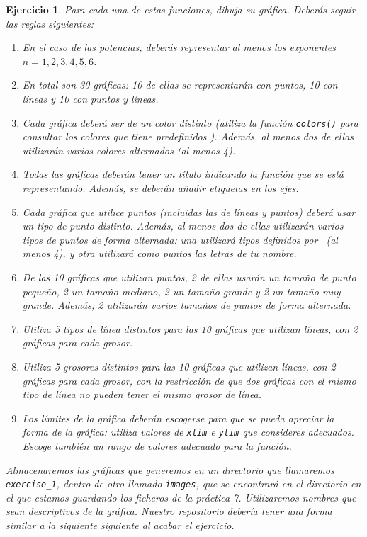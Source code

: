 \documentclass[11pt,a4paper]{article}
\newcommand{\R}{\textcolor{azuluc}{\faIcon{r-project}}}
\theoremstyle{exercise}
\newtheorem{exercise}{Ejercicio}
\begin{document}
\begin{exercise}
Para cada una de estas funciones, dibuja su gráfica. Deberás seguir las reglas siguientes:
\begin{enumerate}
	\item En el caso de las potencias, deberás representar al menos los exponentes $n=1,2,3,4,5,6$.

	\item En total son 30 gráficas: 10 de ellas se representarán con puntos, 10 con líneas y 10 con puntos y líneas.
	
	\item Cada gráfica deberá ser de un color distinto (utiliza la función \texttt{colors()} para consultar los colores que tiene predefinidos \R). Además, al menos dos de ellas utilizarán varios colores alternados (al menos 4).
		
	\item Todas las gráficas deberán tener un título indicando la función que se está representando. Además, se deberán añadir etiquetas en los ejes.
	
	\item Cada gráfica que utilice puntos (incluidas las de líneas y puntos) deberá usar un tipo de punto distinto. Además, al menos dos de ellas utilizarán varios tipos de puntos de forma alternada: una utilizará tipos definidos por \R\ (al menos 4), y otra utilizará como puntos las letras de tu nombre.

	\item De las 10 gráficas que utilizan puntos, 2 de ellas usarán un tamaño de punto pequeño, 2 un tamaño mediano, 2 un tamaño grande y 2 un tamaño muy grande. Además, 2 utilizarán varios tamaños de puntos de forma alternada.
	
	\item Utiliza 5 tipos de línea distintos para las 10 gráficas que utilizan líneas, con 2 gráficas para cada grosor.

	\item Utiliza 5 grosores distintos para las 10 gráficas que utilizan líneas, con 2 gráficas para cada grosor, con la restricción de que dos gráficas con el mismo tipo de línea no pueden tener el mismo grosor de línea.

	\item Los límites de la gráfica deberán escogerse para que se pueda apreciar la forma de la gráfica: utiliza valores de \texttt{xlim} e \texttt{ylim} que consideres adecuados. Escoge también un rango de valores adecuado para la función.
\end{enumerate}
Almacenaremos las gráficas que generemos en un directorio que llamaremos \texttt{exercise\_1}, dentro de otro llamado \texttt{images}, que se encontrará en el directorio en el que estamos guardando los ficheros de la práctica 7. Utilizaremos nombres que sean descriptivos de la gráfica. Nuestro repositorio debería tener una forma similar a la siguiente siguiente al acabar el ejercicio.


\end{exercise}
\end{document}
